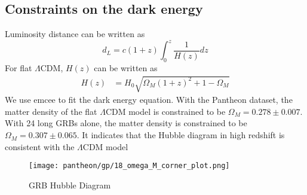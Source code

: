 \subsection{Constraints on the dark energy}
Luminosity distance can be written as
\begin{equation}
    d_L = c(1+z)  \int_{0}^{z} \frac{1}{H(z)} dz
\end{equation}
For flat $\Lambda$CDM, $H(z)$ can be written as
\begin{align}
    \label{eq4} H(z) &= H_0 \sqrt{\Omega_M (1+z)^2 + 1 - \Omega_M}
\end{align}
We use emcee\cite{emcee} to fit the dark energy equation. With the Pantheon dataset, the matter density of the flat $\Lambda$CDM model is constrained to be $\Omega_M=0.278 \pm 0.007$. With 24 long GRBs alone, the matter density is constrained to be $\Omega_M=0.307 \pm 0.065$. It indicates that the Hubble diagram in high redshift is consistent with the $\Lambda$CDM model
\begin{figure}[H]
	\centering
	\texttt{[image: pantheon/gp/18\_omega\_M\_corner\_plot.png]}
	\caption{GRB Hubble Diagram}
	\label{fig:OmegaM_GP}
\end{figure}

